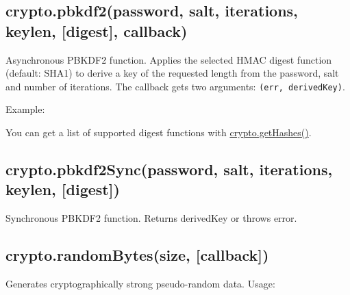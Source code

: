 \subsection{crypto.pbkdf2(password, salt, iterations, keylen,
{[}digest{]},
callback)}\label{crypto.pbkdf2password-salt-iterations-keylen-digest-callback}

Asynchronous PBKDF2 function. Applies the selected HMAC digest function
(default: SHA1) to derive a key of the requested length from the
password, salt and number of iterations. The callback gets two
arguments: \texttt{(err, derivedKey)}.

Example:

\begin{Shaded}
\begin{Highlighting}[]
\NormalTok{(}\NormalTok{, }\NormalTok{, }\NormalTok{, }\NormalTok{, }\NormalTok{, }
   
     
  \NormalTok{(}\NormalTok{(}\NormalTok{));  }
\NormalTok{\});}
\end{Highlighting}
\end{Shaded}

You can get a list of supported digest functions with
\hyperref[cryptoux5fcryptoux5fgethashes]{crypto.getHashes()}.

\subsection{crypto.pbkdf2Sync(password, salt, iterations, keylen,
{[}digest{]})}\label{crypto.pbkdf2syncpassword-salt-iterations-keylen-digest}

Synchronous PBKDF2 function. Returns derivedKey or throws error.

\subsection{crypto.randomBytes(size,
{[}callback{]})}\label{crypto.randombytessize-callback}

Generates cryptographically strong pseudo-random data. Usage:

